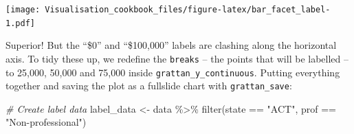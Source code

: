 \documentclass[
]{book}
\newenvironment{Shaded}{\begin{snugshade}}{\end{snugshade}}
\newcommand{\CommentTok}[1]{\textcolor[rgb]{0.56,0.35,0.01}{\textit{#1}}}
\newcommand{\FunctionTok}[1]{\textcolor[rgb]{0.00,0.00,0.00}{#1}}
\newcommand{\NormalTok}[1]{#1}
\newcommand{\OtherTok}[1]{\textcolor[rgb]{0.56,0.35,0.01}{#1}}
\newcommand{\SpecialCharTok}[1]{\textcolor[rgb]{0.00,0.00,0.00}{#1}}
\newcommand{\StringTok}[1]{\textcolor[rgb]{0.31,0.60,0.02}{#1}}
\begin{document}
\texttt{[image: Visualisation\_cookbook\_files/figure-latex/bar\_facet\_label-1.pdf]}

Superior! But the ``\$0'' and ``\$100,000'' labels are clashing along the horizontal axis. To tidy these up, we redefine the \texttt{breaks} -- the points that will be labelled -- to 25,000, 50,000 and 75,000 inside \texttt{grattan\_y\_continuous}. Putting everything together and saving the plot as a fullslide chart with \texttt{grattan\_save}:

\begin{Shaded}
\begin{Highlighting}[]
\CommentTok{\# Create label data}
\NormalTok{label\_data }\OtherTok{\textless{}{-}}\NormalTok{ data }\SpecialCharTok{\%\textgreater{}\%} 
  \FunctionTok{filter}\NormalTok{(state }\SpecialCharTok{==} \StringTok{"ACT"}\NormalTok{,}
\NormalTok{         prof }\SpecialCharTok{==} \StringTok{"Non{-}professional"}\NormalTok{)}


\end{Highlighting}
\end{Shaded}
\end{document}
